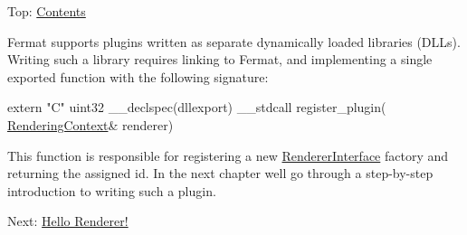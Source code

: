 Top\+: \hyperlink{_overture_contents_page}{Contents}

\begin{DoxyParagraph}{}
Fermat supports plugins written as separate dynamically loaded libraries (D\+L\+Ls). Writing such a library requires linking to Fermat, and implementing a single exported function with the following signature\+: ~\newline

\begin{DoxyCode}
\textcolor{keyword}{extern} \textcolor{stringliteral}{"C"} uint32 \_\_declspec(dllexport) \_\_stdcall register\_plugin(
      \hyperlink{struct_rendering_context}{RenderingContext}& renderer)
\end{DoxyCode}

\end{DoxyParagraph}
\begin{DoxyParagraph}{}
This function is responsible for registering a new \hyperlink{struct_renderer_interface}{Renderer\+Interface} factory and returning the assigned id. In the next chapter we\textquotesingle{}ll go through a step-\/by-\/step introduction to writing such a plugin.
\end{DoxyParagraph}
Next\+: \hyperlink{_hello_renderer_page}{Hello Renderer!} 